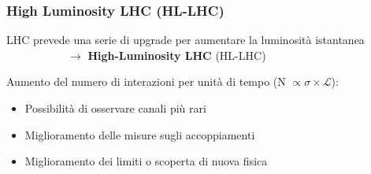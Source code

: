 \documentclass{beamer}
\begin{document}
\begin{frame}
\frametitle{High Luminosity LHC (HL-LHC)}
 {
LHC prevede una serie di upgrade per aumentare la luminosit\`a istantanea \\
\ \ \ \ \ \ \ \ \ \ \  $\rightarrow$ \textbf{High-Luminosity LHC} (HL-LHC)

Aumento del numero di interazioni per unit\`a di tempo (N $\propto \sigma \times \mathcal{L}$):\\
\begin{itemize}
\item Possibilit\`a di osservare canali pi\`u rari
\item Miglioramento delle misure sugli accoppiamenti
\item Miglioramento dei limiti o scoperta di nuova fisica
\end{itemize}}


\end{frame}
\end{document}

